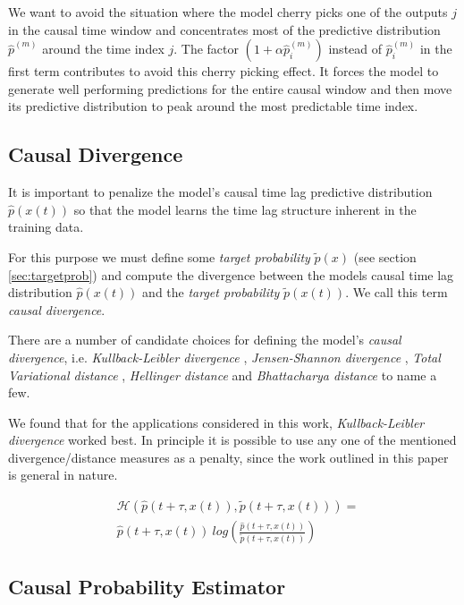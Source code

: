 \documentclass[runningheads]{llncs}
\begin{document}
We want to avoid the situation where the model cherry picks one of the outputs 
$j$ in the causal time window and concentrates most of the predictive 
distribution $\hat p^{(m)}$ around the time index $j$. The factor 
$(1 + \alpha \hat p_i^{(m)})$ instead of $\hat p_i^{(m)}$ in the first term 
contributes to avoid this cherry picking effect. It forces the model to 
generate well performing predictions for the entire causal window and then 
move its predictive distribution to peak around the most predictable time index.

\subsection{Causal Divergence}

It is important to penalize the model's causal time lag predictive distribution 
$\hat{p}(x(t))$ so that the model learns the time lag structure inherent in the 
training data.

For this purpose we must define some \emph{target probability} $\tilde{p}(x)$ 
(see section \ref{sec:targetprob}) and compute the divergence between the models causal 
time lag distribution $\hat{p}(x(t))$ and the \emph{target probability} $\tilde{p}(x(t))$. 
We call this term \emph{causal divergence}.

There are a number of candidate choices for defining the model's \emph{causal divergence}, 
i.e.  \emph{Kullback-Leibler divergence} \cite{kullback1951}, 
\emph{Jensen-Shannon divergence} \cite{jensen-shannon}, \emph{Total Variational distance} 
\cite{villani2009three}, \emph{Hellinger distance} \cite{hellinger} and 
\emph{Bhattacharya distance} \cite{bhattacharyya} to name a few. 

We found that for the applications considered in this work, \emph{Kullback-Leibler divergence} 
worked best. In principle it is possible to use any one of the mentioned 
divergence/distance measures as a penalty, since the work outlined in this 
paper is general in nature.

\begin{align}\label{eq:causaldiv}
&\mathcal{H}\left(\hat{p}(t + \tau, x(t)), \tilde{p}(t + \tau, x(t))\right) = \\
&\nonumber \hat{p}(t + \tau, x(t)) \ log \left( \frac{\hat{p}(t + \tau, x(t))}{\tilde{p}(t + \tau, x(t))}\right)
\end{align}

\subsection{Causal Probability Estimator}
\end{document}
